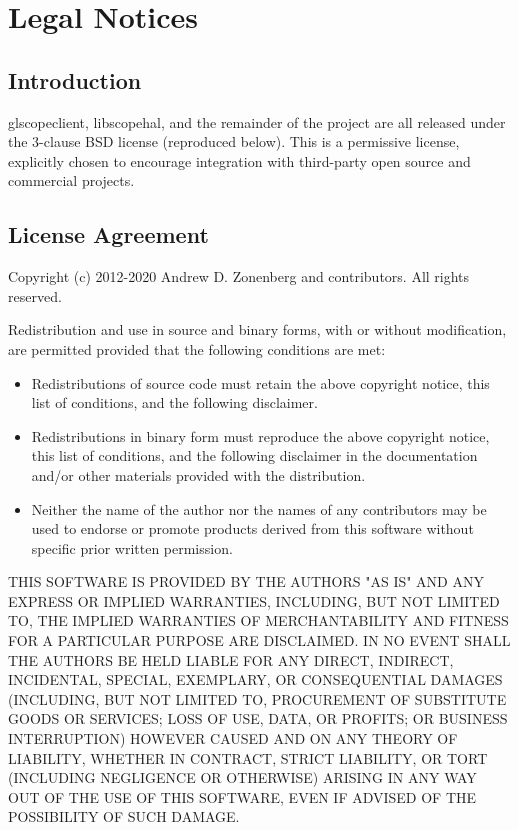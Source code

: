 \chapter{Legal Notices}

\section{Introduction}

glscopeclient, libscopehal, and the remainder of the project are all released under the 3-clause BSD license
(reproduced below). This is a permissive license, explicitly chosen to encourage integration with third-party open
source and commercial projects.

\section{License Agreement}

Copyright (c) 2012-2020 Andrew D. Zonenberg and contributors.
All rights reserved.

Redistribution and use in source and binary forms, with or without modification, are permitted provided that the
following conditions are met:
\begin{itemize}
\item Redistributions of source code must retain the above copyright notice, this list of conditions, and the
following disclaimer.
\item Redistributions in binary form must reproduce the above copyright notice, this list of conditions, and the
following disclaimer in the documentation and/or other materials provided with the distribution.
\item Neither the name of the author nor the names of any contributors may be used to endorse or promote products
derived from this software without specific prior written permission.
\end{itemize}

THIS SOFTWARE IS PROVIDED BY THE AUTHORS "AS IS" AND ANY EXPRESS OR IMPLIED WARRANTIES, INCLUDING, BUT NOT LIMITED
TO, THE IMPLIED WARRANTIES OF MERCHANTABILITY AND FITNESS FOR A PARTICULAR PURPOSE ARE DISCLAIMED. IN NO EVENT SHALL
THE AUTHORS BE HELD LIABLE FOR ANY DIRECT, INDIRECT, INCIDENTAL, SPECIAL, EXEMPLARY, OR CONSEQUENTIAL DAMAGES
(INCLUDING, BUT NOT LIMITED TO, PROCUREMENT OF SUBSTITUTE GOODS OR SERVICES; LOSS OF USE, DATA, OR PROFITS; OR
BUSINESS INTERRUPTION) HOWEVER CAUSED AND ON ANY THEORY OF LIABILITY, WHETHER IN CONTRACT, STRICT LIABILITY, OR TORT
(INCLUDING NEGLIGENCE OR OTHERWISE) ARISING IN ANY WAY OUT OF THE USE OF THIS SOFTWARE, EVEN IF ADVISED OF THE
POSSIBILITY OF SUCH DAMAGE.

